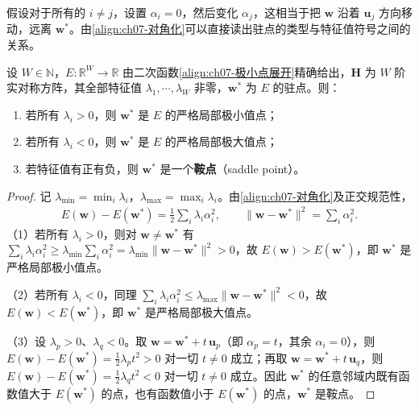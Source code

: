 \documentclass[../../main.tex]{subfiles}
\begin{document}
假设对于所有的 $i\neq j$，设置 $\alpha_i=0$，然后变化 $\alpha_j$，这相当于把 $\mathbf{w}$ 沿着 $\mathbf{u}_j$ 方向移动，远离 $\mathbf{w}^{\ast}$。由\eqref{align:ch07-对角化}可以直接读出驻点的类型与特征值符号之间的关系。

\begin{proposition}[驻点类型与特征值符号]\label{proposition:ch07-驻点分类}
设 $W\in\mathbb{N}$，$E:\mathbb{R}^{W}\to\mathbb{R}$ 由二次函数\eqref{align:ch07-极小点展开}精确给出，$\mathbf{H}$ 为 $W$ 阶实对称方阵，其全部特征值 $\lambda_{1},\cdots,\lambda_{W}$ 非零，$\mathbf{w}^{\ast}$ 为 $E$ 的驻点。则：
\begin{enumerate}
\item 若所有 $\lambda_i>0$，则 $\mathbf{w}^{\ast}$ 是 $E$ 的严格局部极小值点；
\item 若所有 $\lambda_i<0$，则 $\mathbf{w}^{\ast}$ 是 $E$ 的严格局部极大值点；
\item 若特征值有正有负，则 $\mathbf{w}^{\ast}$ 是一个\textbf{鞍点}（saddle point）。
\end{enumerate}
\end{proposition}
\begin{proof}
记 $\lambda_{\min}=\min_i\lambda_i$，$\lambda_{\max}=\max_i\lambda_i$。由\eqref{align:ch07-对角化}及正交规范性，
\begin{align*}
E(\mathbf{w})-E(\mathbf{w}^{\ast})=\frac{1}{2}\sum_i\lambda_i\alpha_i^{2},\qquad
\|\mathbf{w}-\mathbf{w}^{\ast}\|^{2}=\sum_i\alpha_i^{2}.
\end{align*}
（1）若所有 $\lambda_i>0$，则对 $\mathbf{w}\neq\mathbf{w}^{\ast}$ 有 $\sum_i\lambda_i\alpha_i^{2}\geqslant\lambda_{\min}\sum_i\alpha_i^{2}=\lambda_{\min}\|\mathbf{w}-\mathbf{w}^{\ast}\|^{2}>0$，故 $E(\mathbf{w})>E(\mathbf{w}^{\ast})$，即 $\mathbf{w}^{\ast}$ 是严格局部极小值点。

（2）若所有 $\lambda_i<0$，同理 $\sum_i\lambda_i\alpha_i^{2}\leqslant\lambda_{\max}\|\mathbf{w}-\mathbf{w}^{\ast}\|^{2}<0$，故 $E(\mathbf{w})<E(\mathbf{w}^{\ast})$，即 $\mathbf{w}^{\ast}$ 是严格局部极大值点。

（3）设 $\lambda_p>0$、$\lambda_q<0$。取 $\mathbf{w}=\mathbf{w}^{\ast}+t\,\mathbf{u}_p$（即 $\alpha_p=t$，其余 $\alpha_i=0$），则 $E(\mathbf{w})-E(\mathbf{w}^{\ast})=\frac{1}{2}\lambda_pt^{2}>0$ 对一切 $t\neq0$ 成立；再取 $\mathbf{w}=\mathbf{w}^{\ast}+t\,\mathbf{u}_q$，则 $E(\mathbf{w})-E(\mathbf{w}^{\ast})=\frac{1}{2}\lambda_qt^{2}<0$ 对一切 $t\neq0$ 成立。因此 $\mathbf{w}^{\ast}$ 的任意邻域内既有函数值大于 $E(\mathbf{w}^{\ast})$ 的点，也有函数值小于 $E(\mathbf{w}^{\ast})$ 的点，$\mathbf{w}^{\ast}$ 是鞍点。
\end{proof}
\end{document}
